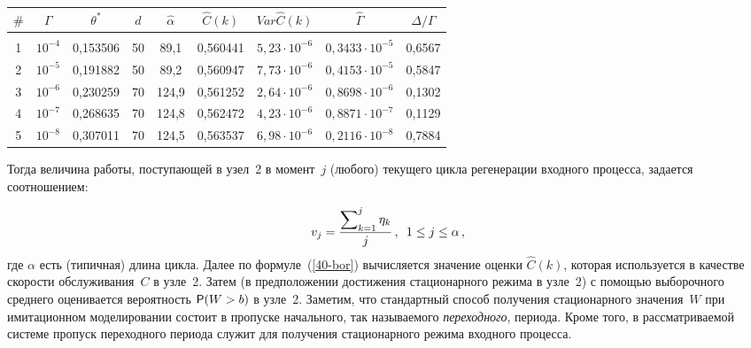 \begin{multicols}{2}
\begin{table*}
\begin{center}
\begin{tabular}{|c|c|c|c|c|c|c|c|c|}
\hline
$\#$ & $\Gamma$ & $\theta^*$ & $d$& $\hat\alpha$ &$\hat{C}(k)$ & $Var \hat{C}(k)$ & $\hat\Gamma$ & $\Delta/\Gamma$\\
\hline 
&&&&&&&&\\[-9pt]
1 &  $10^{-4}$ &  0,153506 & 50 & \hphantom{9}89,1 & 0,560441 & $5{,}23\cdot 10^{-6}$  & $0{,}3433 \cdot 10^{-5}$ & 0,6567\\
2 &  $10^{-5}$ & 0,191882 & 50 & \hphantom{9}89,2 & 0,560947 & $7{,}73\cdot 10^{-6}$ & $0{,}4153 \cdot 10^{-5}$ & 0,5847\\
3 &  $10^{-6}$ & 0,230259 & 70 & 124,9& 0,561252 &  $2{,}64\cdot 10^{-6}$ & $0{,}8698 \cdot 10^{-6}$ & 0,1302\\
4 &  $10^{-7}$ & 0,268635 & 70 & 124,8 & 0,562472 &  $4{,}23\cdot 10^{-6}$ & $0{,}8871 \cdot 10^{-7}$ & 0,1129\\
5 &  $10^{-8}$ &  0,307011 & 70 & 124,5 & 0,563537  &  $6{,}98\cdot 10^{-6}$ & $0{,}2116 \cdot 10^{-8}$ & 0,7884\\
\hline
\end{tabular}
\end{center}
\vspace*{-6pt}
\end{table*}

\noindent
Тогда  величина работы, поступающей в узел~2 в момент~$j$ (любого)
текущего цикла регенерации входного процесса, задается соотношением:

\noindent
\begin{equation}
v_j = \displaystyle\frac{\displaystyle \sum\nolimits_{k=1}^{j}\eta_k\mathstrut}{\displaystyle j\mathstrut}\,,\enskip 1 \le j \le \alpha\,,
\label{dependence}
\end{equation}
где    $\alpha$  есть (типичная) длина цикла. Далее по формуле~(\ref{40-bor})  
вычисляется  значение  оценки $\hat{C}(k)$, которая
используется  в качестве скорости обслуживания~$C$ в узле~2.  Затем
(в предположении достижения
 стационарного режима в узле~2) с помощью выборочного среднего   оценивается
 вероятность ${\sf P}(W>b)$ в узле~2.  Заметим, что стандартный способ  получения стационарного
 значения~$W$  при имитационном моделировании состоит
  в пропуске начального, так называемого {\it  переходного},  периода.
 Кроме того, в рассматриваемой системе  пропуск  переходного  периода служит для   получения
 стационарного режима входного процесса.


\end{multicols}
